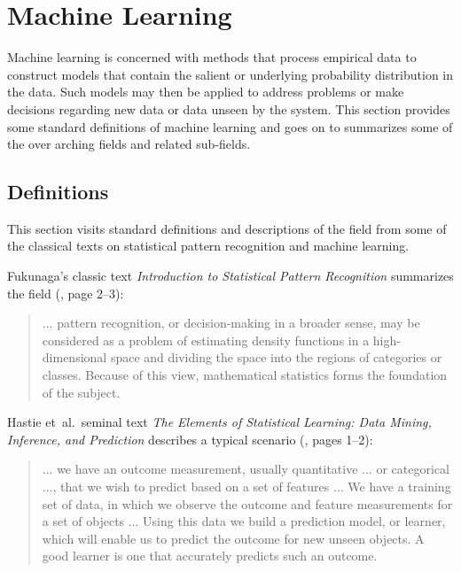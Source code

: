 
\section{Machine Learning} 
\label{intro:machinelearning}

Machine learning is concerned with methods that process empirical data to construct models that contain the salient or underlying probability distribution in the data. Such models may then be applied to address problems or make decisions regarding new data or data unseen by the system.
This section provides some standard definitions of machine learning and goes on to summarizes some of the over arching fields and related sub-fields.

\subsection{Definitions}
\label{subsec:definitions}
This section visits standard definitions and descriptions of the field from some of the classical texts on statistical pattern recognition and machine learning. 

Fukunaga's classic text \emph{Introduction to Statistical Pattern Recognition} summarizes the field (\cite{Fukunaga1990}, page 2--3):

\begin{quotation}
... pattern recognition, or decision-making in a broader sense, may be considered as a problem of estimating density functions in a high-dimensional space and dividing the space into the regions of categories or classes. Because of this view, mathematical statistics forms the foundation of the subject.
\end{quotation} 

Hastie et~al.\ seminal text \emph{The Elements of Statistical Learning: Data Mining, Inference, and Prediction} describes a typical scenario (\cite{Hastie2009}, pages 1--2):

\begin{quotation}
... we have an outcome measurement, usually quantitative ... or categorical ..., that we wish to predict based on a set of features ... We have a training set of data, in which we observe the outcome and feature measurements for a set of objects ... Using this data we build a prediction model, or learner, which will enable us to predict the outcome for new unseen objects. A good learner is one that accurately predicts such an outcome.
\end{quotation} 

